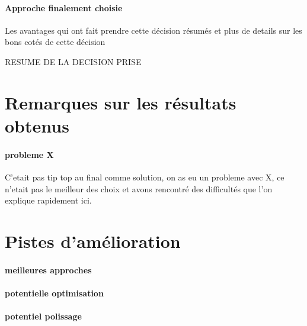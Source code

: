 \documentclass[
	headsepline=on,
	footsepline=on,
	twoside=off,
	abstract=on,
	DIV=10
]{scrreprt}
\begin{document}
				\paragraph{Approche finalement choisie}
				Les avantages qui ont fait prendre cette décision résumés et plus de details sur les bons cotés de cette décision
			
				\begin{result}
					RESUME DE LA DECISION PRISE
				\end{result}
				
			\section{Remarques sur les résultats obtenus}
			
				\paragraph{probleme X}
				C'etait pas tip top au final comme solution, on as eu un probleme avec X, ce n'etait pas le meilleur des choix et avons rencontré des difficultés que l'on explique rapidement ici.
				
			\section{Pistes d'amélioration}
			
				\paragraph{meilleures approches}
				
				\paragraph{potentielle optimisation}
				
				\paragraph{potentiel polissage}
		
		
		
\end{document}
